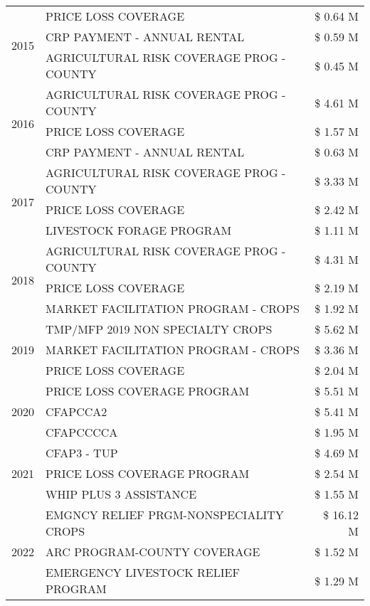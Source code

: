 \begin{tabular}{llr}
\cline{1-3}
\multirow[t]{3}{*}{2015} & PRICE LOSS COVERAGE & \$ 0.64 M \\
 & CRP PAYMENT - ANNUAL RENTAL & \$ 0.59 M \\
 & AGRICULTURAL RISK COVERAGE PROG - COUNTY & \$ 0.45 M \\
\cline{1-3}
\multirow[t]{3}{*}{2016} & AGRICULTURAL RISK COVERAGE PROG - COUNTY & \$ 4.61 M \\
 & PRICE LOSS COVERAGE & \$ 1.57 M \\
 & CRP PAYMENT - ANNUAL RENTAL & \$ 0.63 M \\
\cline{1-3}
\multirow[t]{3}{*}{2017} & AGRICULTURAL RISK COVERAGE PROG - COUNTY & \$ 3.33 M \\
 & PRICE LOSS COVERAGE & \$ 2.42 M \\
 & LIVESTOCK FORAGE PROGRAM & \$ 1.11 M \\
\cline{1-3}
\multirow[t]{3}{*}{2018} & AGRICULTURAL RISK COVERAGE PROG - COUNTY & \$ 4.31 M \\
 & PRICE LOSS COVERAGE & \$ 2.19 M \\
 & MARKET FACILITATION PROGRAM - CROPS & \$ 1.92 M \\
\cline{1-3}
\multirow[t]{3}{*}{2019} & TMP/MFP 2019 NON SPECIALTY CROPS & \$ 5.62 M \\
 & MARKET FACILITATION PROGRAM - CROPS & \$ 3.36 M \\
 & PRICE LOSS COVERAGE & \$ 2.04 M \\
\cline{1-3}
\multirow[t]{3}{*}{2020} & PRICE LOSS COVERAGE PROGRAM & \$ 5.51 M \\
 & CFAPCCA2 & \$ 5.41 M \\
 & CFAPCCCCA & \$ 1.95 M \\
\cline{1-3}
\multirow[t]{3}{*}{2021} & CFAP3 - TUP & \$ 4.69 M \\
 & PRICE LOSS COVERAGE PROGRAM & \$ 2.54 M \\
 & WHIP PLUS 3 ASSISTANCE & \$ 1.55 M \\
\cline{1-3}
\multirow[t]{3}{*}{2022} & EMGNCY RELIEF PRGM-NONSPECIALITY CROPS & \$ 16.12 M \\
 & ARC PROGRAM-COUNTY COVERAGE & \$ 1.52 M \\
 & EMERGENCY LIVESTOCK RELIEF PROGRAM & \$ 1.29 M \\
\cline{1-3}
\bottomrule
\end{tabular}
